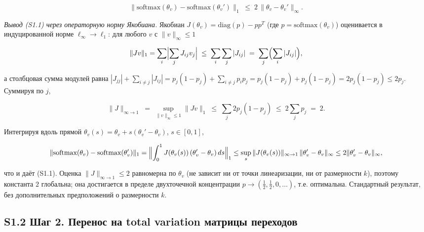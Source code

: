 \documentclass[pdflatex,sn-mathphys-ay]{sn-jnl}
\begin{document}
\begin{equation}\|\text{softmax}(\theta_v) - \text{softmax}(\theta_v')\|_1 \;\le\; 2 \, \|\theta_v - \theta_v'\|_\infty. \tag{S1.1}\end{equation}



\emph{Вывод (S1.1) через операторную норму Якобиана.} Якобиан \(J(\theta_v) = \text{diag}(p) - p p^T\) (где \(p = \text{softmax}(\theta_v)\)) оценивается в индуцированной норме \(\ell_\infty \to \ell_1\): для любого \(v\) с \(\|v\|_\infty \le 1\)



\[\|J v\|_1 = \sum_i \Bigl|\sum_j J_{ij} v_j\Bigr| \;\le\; \sum_i \sum_j |J_{ij}| \;=\; \sum_j \Bigl(\sum_i |J_{ij}|\Bigr),\]



а столбцовая сумма модулей равна \(|J_{jj}| + \sum_{i \ne j}|J_{ij}| = p_j(1-p_j) + \sum_{i \ne j} p_i p_j = p_j(1-p_j) + p_j(1-p_j) = 2 p_j(1-p_j) \le 2 p_j\). Суммируя по \(j\),



\[\|J\|_{\infty \to 1} \;=\; \sup_{\|v\|_\infty \le 1}\|Jv\|_1 \;\le\; \sum_j 2 p_j(1-p_j) \;\le\; 2 \sum_j p_j \;=\; 2.\]



Интегрируя вдоль прямой \(\theta_v(s) = \theta_v + s(\theta_v'-\theta_v)\), \(s \in [0,1]\),



\[\|\text{softmax}(\theta_v) - \text{softmax}(\theta_v')\|_1 = \Bigl\|\int_0^1 J(\theta_v(s))\,(\theta_v'-\theta_v)\,ds\Bigr\|_1 \le \sup_s \|J(\theta_v(s))\|_{\infty\to 1}\,\|\theta_v'-\theta_v\|_\infty \le 2\|\theta_v'-\theta_v\|_\infty,\]



что и даёт (S1.1). Оценка \(\|J\|_{\infty\to 1}\le 2\) равномерна по \(\theta_v\) (не зависит ни от точки линеаризации, ни от размерности \(k\)), поэтому константа \(2\) глобальна; она достигается в пределе двухточечной концентрации \(p \to (\tfrac12,\tfrac12,0,\dots)\), т.е. оптимальна. Стандартный результат, без дополнительных предположений о размерности \(k\).



\subsection*{S1.2 Шаг 2. Перенос на total variation матрицы переходов}\label{s1.2-ux448ux430ux433-2.-ux43fux435ux440ux435ux43dux43eux441-ux43dux430-total-variation-ux43cux430ux442ux440ux438ux446ux44b-ux43fux435ux440ux435ux445ux43eux434ux43eux432}
\end{document}
